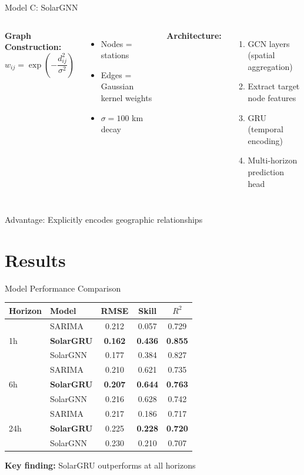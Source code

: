 \documentclass[aspectratio=169,11pt]{beamer}
\begin{document}
\begin{frame}{Model C: SolarGNN}
\begin{columns}
\textbf{Graph Construction:}
\[
w_{ij} = \exp\left(-\frac{d_{ij}^2}{\sigma^2}\right)
\]

\begin{itemize}
    \item Nodes = stations
    \item Edges = Gaussian kernel weights
    \item $\sigma = 100$ km decay
\end{itemize}

\textbf{Architecture:}
\begin{enumerate}
    \item GCN layers (spatial aggregation)
    \item Extract target node features
    \item GRU (temporal encoding)
    \item Multi-horizon prediction head
\end{enumerate}
\end{columns}

\vspace{0.5cm}
\centering
\alert{Advantage:} Explicitly encodes geographic relationships
\end{frame}

\section{Results}

\begin{frame}{Model Performance Comparison}
\centering
\begin{tabular}{llccc}
\toprule
\textbf{Horizon} & \textbf{Model} & \textbf{RMSE} & \textbf{Skill} & \textbf{$R^2$} \\
\midrule
\multirow{3}{*}{1h} 
& SARIMA & 0.212 & 0.057 & 0.729 \\
& \textbf{SolarGRU} & \textbf{0.162} & \textbf{0.436} & \textbf{0.855} \\
& SolarGNN & 0.177 & 0.384 & 0.827 \\
\midrule
\multirow{3}{*}{6h}
& SARIMA & 0.210 & 0.621 & 0.735 \\
& \textbf{SolarGRU} & \textbf{0.207} & \textbf{0.644} & \textbf{0.763} \\
& SolarGNN & 0.216 & 0.628 & 0.742 \\
\midrule
\multirow{3}{*}{24h}
& SARIMA & 0.217 & 0.186 & 0.717 \\
& \textbf{SolarGRU} & 0.225 & \textbf{0.228} & \textbf{0.720} \\
& SolarGNN & 0.230 & 0.210 & 0.707 \\
\bottomrule
\end{tabular}

\vspace{0.3cm}
\textbf{Key finding:} SolarGRU outperforms at all horizons
\end{frame}
\end{document}
